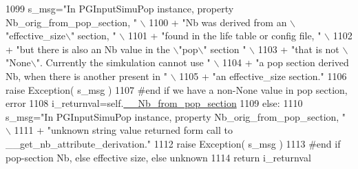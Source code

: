\begin{DoxyCode}
1099                 s\_msg=\textcolor{stringliteral}{"In PGInputSimuPop instance, property Nb\_orig\_from\_pop\_section, "} \(\backslash\)
1100                         + \textcolor{stringliteral}{"Nb was derived from an \(\backslash\)"effective\_size\(\backslash\)" section, "} \(\backslash\)
1101                         + \textcolor{stringliteral}{"found in the life table or config file, "} \(\backslash\)
1102                         + \textcolor{stringliteral}{"but there is also an Nb value in the \(\backslash\)"pop\(\backslash\)" section "} \(\backslash\)
1103                         + \textcolor{stringliteral}{"that is not \(\backslash\)"None\(\backslash\)".  Currently the simkulation cannot use "} \(\backslash\)
1104                         + \textcolor{stringliteral}{"a pop section derived Nb, when there is another present in "} \(\backslash\)
1105                         + \textcolor{stringliteral}{"an effective\_size section."}
1106                 \textcolor{keywordflow}{raise} Exception( s\_msg )
1107             \textcolor{comment}{#end if we have a non-None value in pop section, error}
1108             i\_returnval=self.\hyperlink{classnegui_1_1pginputsimupop_1_1PGInputSimuPop_a2525ee53b93e309b99914e0cdf175901}{\_\_Nb\_from\_pop\_section}
1109         \textcolor{keywordflow}{else}:
1110             s\_msg=\textcolor{stringliteral}{"In PGInputSimuPop instance, property Nb\_orig\_from\_pop\_section, "} \(\backslash\)
1111                     + \textcolor{stringliteral}{"unknown string value returned form call to \_\_get\_nb\_attribute\_derivation."} 
1112             \textcolor{keywordflow}{raise} Exception( s\_msg )
1113         \textcolor{comment}{#end if pop-section Nb, else effective size, else unknown}
1114         \textcolor{keywordflow}{return} i\_returnval
\end{DoxyCode}
